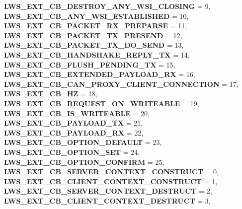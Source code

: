 \begin{DoxyCompactItemize}
{\bfseries L\+W\+S\+\_\+\+E\+X\+T\+\_\+\+C\+B\+\_\+\+D\+E\+S\+T\+R\+O\+Y\+\_\+\+A\+N\+Y\+\_\+\+W\+S\+I\+\_\+\+C\+L\+O\+S\+I\+NG} = 9, 
\newline
{\bfseries L\+W\+S\+\_\+\+E\+X\+T\+\_\+\+C\+B\+\_\+\+A\+N\+Y\+\_\+\+W\+S\+I\+\_\+\+E\+S\+T\+A\+B\+L\+I\+S\+H\+ED} = 10, 
{\bfseries L\+W\+S\+\_\+\+E\+X\+T\+\_\+\+C\+B\+\_\+\+P\+A\+C\+K\+E\+T\+\_\+\+R\+X\+\_\+\+P\+R\+E\+P\+A\+R\+SE} = 11, 
{\bfseries L\+W\+S\+\_\+\+E\+X\+T\+\_\+\+C\+B\+\_\+\+P\+A\+C\+K\+E\+T\+\_\+\+T\+X\+\_\+\+P\+R\+E\+S\+E\+ND} = 12, 
{\bfseries L\+W\+S\+\_\+\+E\+X\+T\+\_\+\+C\+B\+\_\+\+P\+A\+C\+K\+E\+T\+\_\+\+T\+X\+\_\+\+D\+O\+\_\+\+S\+E\+ND} = 13, 
\newline
{\bfseries L\+W\+S\+\_\+\+E\+X\+T\+\_\+\+C\+B\+\_\+\+H\+A\+N\+D\+S\+H\+A\+K\+E\+\_\+\+R\+E\+P\+L\+Y\+\_\+\+TX} = 14, 
{\bfseries L\+W\+S\+\_\+\+E\+X\+T\+\_\+\+C\+B\+\_\+\+F\+L\+U\+S\+H\+\_\+\+P\+E\+N\+D\+I\+N\+G\+\_\+\+TX} = 15, 
{\bfseries L\+W\+S\+\_\+\+E\+X\+T\+\_\+\+C\+B\+\_\+\+E\+X\+T\+E\+N\+D\+E\+D\+\_\+\+P\+A\+Y\+L\+O\+A\+D\+\_\+\+RX} = 16, 
{\bfseries L\+W\+S\+\_\+\+E\+X\+T\+\_\+\+C\+B\+\_\+\+C\+A\+N\+\_\+\+P\+R\+O\+X\+Y\+\_\+\+C\+L\+I\+E\+N\+T\+\_\+\+C\+O\+N\+N\+E\+C\+T\+I\+ON} = 17, 
\newline
{\bfseries L\+W\+S\+\_\+\+E\+X\+T\+\_\+\+C\+B\+\_\+HZ} = 18, 
{\bfseries L\+W\+S\+\_\+\+E\+X\+T\+\_\+\+C\+B\+\_\+\+R\+E\+Q\+U\+E\+S\+T\+\_\+\+O\+N\+\_\+\+W\+R\+I\+T\+E\+A\+B\+LE} = 19, 
{\bfseries L\+W\+S\+\_\+\+E\+X\+T\+\_\+\+C\+B\+\_\+\+I\+S\+\_\+\+W\+R\+I\+T\+E\+A\+B\+LE} = 20, 
{\bfseries L\+W\+S\+\_\+\+E\+X\+T\+\_\+\+C\+B\+\_\+\+P\+A\+Y\+L\+O\+A\+D\+\_\+\+TX} = 21, 
\newline
{\bfseries L\+W\+S\+\_\+\+E\+X\+T\+\_\+\+C\+B\+\_\+\+P\+A\+Y\+L\+O\+A\+D\+\_\+\+RX} = 22, 
{\bfseries L\+W\+S\+\_\+\+E\+X\+T\+\_\+\+C\+B\+\_\+\+O\+P\+T\+I\+O\+N\+\_\+\+D\+E\+F\+A\+U\+LT} = 23, 
{\bfseries L\+W\+S\+\_\+\+E\+X\+T\+\_\+\+C\+B\+\_\+\+O\+P\+T\+I\+O\+N\+\_\+\+S\+ET} = 24, 
{\bfseries L\+W\+S\+\_\+\+E\+X\+T\+\_\+\+C\+B\+\_\+\+O\+P\+T\+I\+O\+N\+\_\+\+C\+O\+N\+F\+I\+RM} = 25, 
\newline
{\bfseries L\+W\+S\+\_\+\+E\+X\+T\+\_\+\+C\+B\+\_\+\+S\+E\+R\+V\+E\+R\+\_\+\+C\+O\+N\+T\+E\+X\+T\+\_\+\+C\+O\+N\+S\+T\+R\+U\+CT} = 0, 
{\bfseries L\+W\+S\+\_\+\+E\+X\+T\+\_\+\+C\+B\+\_\+\+C\+L\+I\+E\+N\+T\+\_\+\+C\+O\+N\+T\+E\+X\+T\+\_\+\+C\+O\+N\+S\+T\+R\+U\+CT} = 1, 
{\bfseries L\+W\+S\+\_\+\+E\+X\+T\+\_\+\+C\+B\+\_\+\+S\+E\+R\+V\+E\+R\+\_\+\+C\+O\+N\+T\+E\+X\+T\+\_\+\+D\+E\+S\+T\+R\+U\+CT} = 2, 
{\bfseries L\+W\+S\+\_\+\+E\+X\+T\+\_\+\+C\+B\+\_\+\+C\+L\+I\+E\+N\+T\+\_\+\+C\+O\+N\+T\+E\+X\+T\+\_\+\+D\+E\+S\+T\+R\+U\+CT} = 3, 

\end{DoxyCompactItemize}
